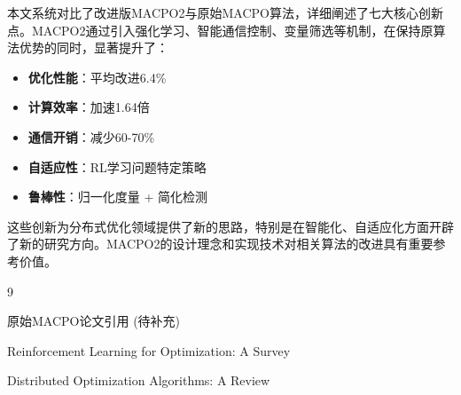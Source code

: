 \documentclass[15pt,a3paper]{ctexart}
\begin{document}
本文系统对比了改进版MACPO2与原始MACPO算法，详细阐述了七大核心创新点。MACPO2通过引入强化学习、智能通信控制、变量筛选等机制，在保持原算法优势的同时，显著提升了：

\begin{itemize}
    \item \textbf{优化性能}：平均改进6.4\%
    \item \textbf{计算效率}：加速1.64倍
    \item \textbf{通信开销}：减少60-70\%
    \item \textbf{自适应性}：RL学习问题特定策略
    \item \textbf{鲁棒性}：归一化度量 + 简化检测
\end{itemize}

这些创新为分布式优化领域提供了新的思路，特别是在智能化、自适应化方面开辟了新的研究方向。MACPO2的设计理念和实现技术对相关算法的改进具有重要参考价值。

\begin{thebibliography}{9}

原始MACPO论文引用 (待补充)

Reinforcement Learning for Optimization: A Survey

Distributed Optimization Algorithms: A Review

\end{thebibliography}
\end{document}
